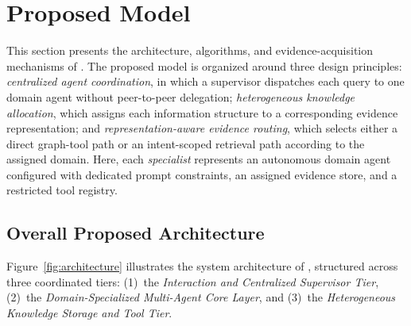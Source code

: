 \section{Proposed Model}
\label{sec:model}

This section presents the architecture, algorithms, and evidence-acquisition mechanisms of \system{}. The proposed model is organized around three design principles: \emph{centralized agent coordination}, in which a supervisor dispatches each query to one domain agent without peer-to-peer delegation; \emph{heterogeneous knowledge allocation}, which assigns each information structure to a corresponding evidence representation; and \emph{representation-aware evidence routing}, which selects either a direct graph-tool path or an intent-scoped retrieval path according to the assigned domain. Here, each \emph{specialist} represents an autonomous domain agent configured with dedicated prompt constraints, an assigned evidence store, and a restricted tool registry.

\subsection{Overall Proposed Architecture}
\label{sec:architecture}

Figure~\ref{fig:architecture} illustrates the system architecture of \system{}, structured across three coordinated tiers: (1)~the \emph{Interaction and Centralized Supervisor Tier}, (2)~the \emph{Domain-Specialized Multi-Agent Core Layer}, and (3)~the \emph{Heterogeneous Knowledge Storage and Tool Tier}.

